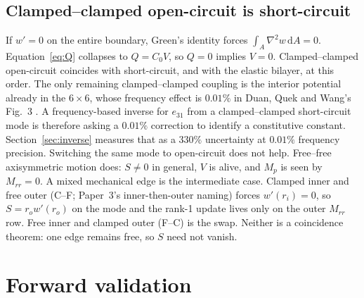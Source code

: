 \documentclass[11pt]{article}
\begin{document}
\subsection{Clamped--clamped open-circuit is short-circuit}
\label{sec:theorem}
If $w'=0$ on the entire boundary, Green's identity forces
$\int_A\nabla^2 w\,\mathrm{d}A=0$. Equation~\eqref{eq:Q} collapses to
$Q=C_0 V$, so $Q=0$ implies $V=0$. Clamped--clamped open-circuit
coincides with short-circuit, and with the elastic bilayer, at this
order. The only remaining clamped--clamped coupling is the interior
potential already in the $6\times6$, whose frequency effect is $0.01\%$ in Duan,
Quek and Wang's Fig.~3 \cite{duan2005}. A frequency-based inverse for
$e_{31}$ from a clamped--clamped short-circuit mode is therefore asking
a $0.01\%$ correction to identify a constitutive constant.
Section~\ref{sec:inverse} measures that as a $330\%$ uncertainty at
$0.01\%$ frequency precision. Switching the same mode to open-circuit
does not help. Free--free axisymmetric motion does: $S\neq0$ in general,
$V$ is alive, and $M_p$ is seen by $M_{rr}=0$. A mixed mechanical edge
is the intermediate case. Clamped inner and free outer (C--F; Paper~3's
inner-then-outer naming) forces $w'(r_i)=0$, so $S=r_o w'(r_o)$ on the
mode and the rank-1 update lives only on the outer $M_{rr}$ row.
Free inner and clamped outer (F--C) is the swap. Neither is a
coincidence theorem: one edge remains free, so $S$ need not vanish.

\section{Forward validation}\label{sec:forward}
\end{document}
